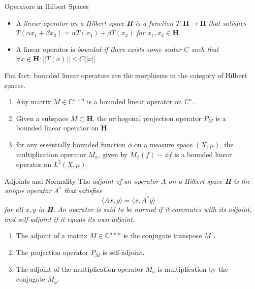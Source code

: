 \documentclass{beamer}
\begin{document}
\begin{frame}{Operators in Hilbert Spaces}
    \begin{itemize}
        \item A \em linear operator \em on a Hilbert space \textbf{H} is a function $T:
        \textbf{H} \to \textbf{H}$ that satisfies
        $T(\alpha x_1 + \beta x_2) = \alpha T(x_1) + \beta T(x_2)$ for $x_1, x_2 \in
        \textbf{H}$.

        \item A linear operator is \em bounded \em if there exists some scalar $C$ such
        that $\forall x\in \textbf{H}: ||T(x)||\leq C||x||$
    \end{itemize}
    \pause
    Fun fact: bounded linear operators are the morphisms in the category
    of Hilbert spaces.
    \pause
    \begin{example}
        \begin{enumerate}
            \item Any matrix $M\in \mathbb{C}^{n\times n}$ is a bounded linear
                operator on $\mathbb{C}^n$.
            \item Given a subspace $M \subset \textbf{H}$, the orthogonal
                projection operator $P_M$ is a bounded linear operator on
                \textbf{H}.
            \item for any essentially bounded function $\phi$ on a measure space
                $(X,\mu)$, the multiplication operator $M_{\phi}$, given by
                $M_{\phi}(f)=\phi f$ is a bounded linear operator on
                $L^2(X,\mu)$.
        \end{enumerate}
    \end{example}
\end{frame}

\begin{frame}{Adjoints and Normality}
    The \em adjoint \em of an operator $A$ on a Hilbert space \textbf{H} is the
    unique operator $A^*$ that satisfies
    \[
        \langle Ax, y \rangle = \langle x, A^*y \rangle
    \]
    for all $x,y$ in \textbf{H}.
    An operator is said to be \em normal \em if it commutes with its adjoint,
    and \em self-adjoint \em if it equals its own adjoint.

    \begin{example}
        \begin{enumerate}
            \item The adjoint of a matrix $M\in \mathbb{C}^{n\times n}$ is the
                conjugate transpose $M^{\dagger}$.
            \item The projection operator $P_M$ is self-adjoint.
            \item The adjoint of the multiplication operator $M_{\phi}$ is
                multiplication by the conjugate $M_{\overline{\phi}}$.
        \end{enumerate}
    \end{example}
\end{frame}
\end{document}
